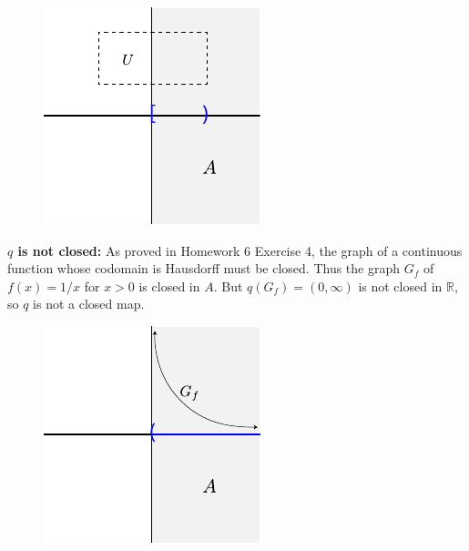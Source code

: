 \documentclass[10pt]{report}
\begin{document}
\begin{figure}[H]
	\centering
	\includegraphics[scale=1]{fig/not-open.pdf}
\end{figure}

\textbf{$q$ is not closed:} As proved in Homework 6 Exercise 4, the graph of a continuous function whose codomain is Hausdorff must be closed. Thus the graph $G_f$ of $f(x) = 1/x$ for $x>0$ is closed in $A$. But $q(G_{f})=(0,\infty)$ is not closed in $\mathbb{R}$, so $q$ is not a closed map.

\begin{figure}[H]
	\centering
	\includegraphics[scale=1]{fig/not-closed.pdf}
\end{figure}
\end{document}
